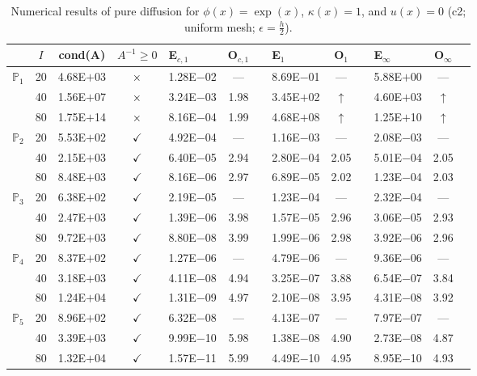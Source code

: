\begin{table}[H]
\centering
\caption{Numerical results of pure diffusion for $\phi(x)=\exp(x)$, $\kappa(x)=1$, and $u(x)=0$ (c2; uniform mesh; $\epsilon=\frac{h}{2}$).}
\begin{tabular}{@{}l c c c l c c l c c l c c@{}}
\toprule
 & $I$ & cond(A) & $A^{-1}\geq 0$ &  E$_{c,1}$ & O$_{c,1}$ && E$_1$ & O$_1$ && E$_{\infty}$ & O$_{\infty}$\\
\midrule
\multirow{3}{*}{$\mathbb{P}_{1}$}
 & 20 & 4.68E$+$03 & $\times$ & 1.28E$-$02 & --- && 8.69E$-$01 & --- && 5.88E$+$00 & ---\\
 & 40 & 1.56E$+$07 & $\times$ & 3.24E$-$03 & 1.98 && 3.45E$+$02 & $\uparrow$ && 4.60E$+$03 & $\uparrow$\\
 & 80 & 1.75E$+$14 & $\times$ & 8.16E$-$04 & 1.99 && 4.68E$+$08 & $\uparrow$ && 1.25E$+$10 & $\uparrow$\\
\midrule
\multirow{3}{*}{$\mathbb{P}_{2}$}
 & 20 & 5.53E$+$02 & $\checkmark$ & 4.92E$-$04 & --- && 1.16E$-$03 & --- && 2.08E$-$03 & ---\\
 & 40 & 2.15E$+$03 & $\checkmark$ & 6.40E$-$05 & 2.94 && 2.80E$-$04 & 2.05 && 5.01E$-$04 & 2.05\\
 & 80 & 8.48E$+$03 & $\checkmark$ & 8.16E$-$06 & 2.97 && 6.89E$-$05 & 2.02 && 1.23E$-$04 & 2.03\\
\midrule
\multirow{3}{*}{$\mathbb{P}_{3}$}
 & 20 & 6.38E$+$02 & $\checkmark$ & 2.19E$-$05 & --- && 1.23E$-$04 & --- && 2.32E$-$04 & ---\\
 & 40 & 2.47E$+$03 & $\checkmark$ & 1.39E$-$06 & 3.98 && 1.57E$-$05 & 2.96 && 3.06E$-$05 & 2.93\\
 & 80 & 9.72E$+$03 & $\checkmark$ & 8.80E$-$08 & 3.99 && 1.99E$-$06 & 2.98 && 3.92E$-$06 & 2.96\\
\midrule
\multirow{3}{*}{$\mathbb{P}_{4}$}
 & 20 & 8.37E$+$02 & $\checkmark$ & 1.27E$-$06 & --- && 4.79E$-$06 & --- && 9.36E$-$06 & ---\\
 & 40 & 3.18E$+$03 & $\checkmark$ & 4.11E$-$08 & 4.94 && 3.25E$-$07 & 3.88 && 6.54E$-$07 & 3.84\\
 & 80 & 1.24E$+$04 & $\checkmark$ & 1.31E$-$09 & 4.97 && 2.10E$-$08 & 3.95 && 4.31E$-$08 & 3.92\\
\midrule
\multirow{3}{*}{$\mathbb{P}_{5}$}
 & 20 & 8.96E$+$02 & $\checkmark$ & 6.32E$-$08 & --- && 4.13E$-$07 & --- && 7.97E$-$07 & ---\\
 & 40 & 3.39E$+$03 & $\checkmark$ & 9.99E$-$10 & 5.98 && 1.38E$-$08 & 4.90 && 2.73E$-$08 & 4.87\\
 & 80 & 1.32E$+$04 & $\checkmark$ & 1.57E$-$11 & 5.99 && 4.49E$-$10 & 4.95 && 8.95E$-$10 & 4.93\\
\bottomrule
\end{tabular}
\end{table}